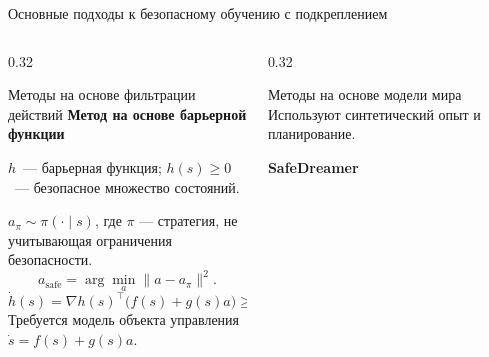 {\begin{frame}[shrink=12]{Основные подходы к безопасному обучению с подкреплением}
\begin{columns}[T,onlytextwidth]
        \begin{column}{0.32\textwidth}
            \begin{block}{Методы на основе фильтрации действий}
                \scriptsize
                \textbf{Метод на основе барьерной функции}

                \(h\)~--- барьерная функция;
                \(h(s)\geq 0\)~--- безопасное множество состояний.

                \(a_\pi \sim \pi(\cdot \mid s)\), где \(\pi\) --- стратегия,
                не учитывающая ограничения безопасности.
                \[
                    a_{\mathrm{safe}}
                    =
                    \arg\min_a \|a-a_\pi\|^2 .
                \]
                \[
                    \dot{h}(s)
                    =
                    \nabla h(s)^\top\!\bigl(f(s)+g(s)a\bigr)
                    \geq 0 .
                \]
                Требуется модель объекта управления \(\dot{s} = f(s) + g(s)a\).
            \end{block}
        \end{column}

        \begin{column}{0.32\textwidth}
            \begin{block}{Методы на основе модели мира}
                \scriptsize
                Используют синтетический опыт и планирование.

                \textbf{SafeDreamer}


\end{block}
\end{column}
\end{columns}
\end{frame}}
